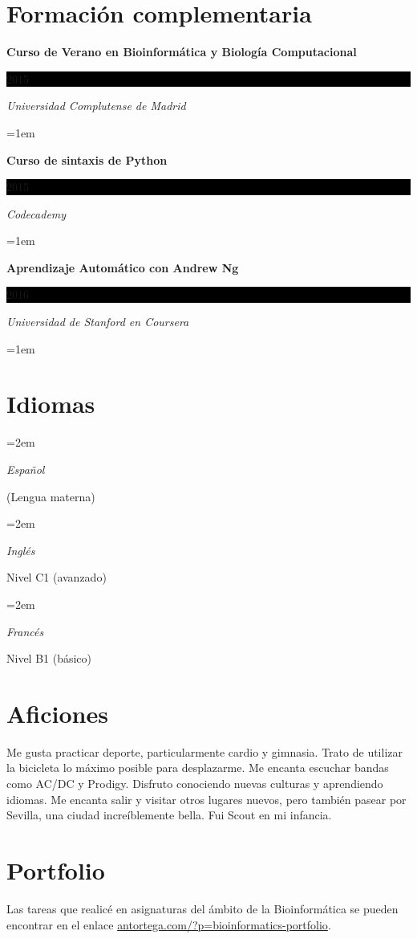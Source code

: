 \documentclass[paper=a4,fontsize=11pt]{article} %
\newlength{\spacebox}
\newcommand{\sepspace}{\vspace*{1em}}		%
\newcommand{\NewPart}[1]{\section*{
									{#1}}}
\newcommand{\PersonalEntry}[2]{
		\noindent\hangindent=2em\hangafter=0 %
		\parbox{\spacebox}{        %
		\textit{#1}}		       %
		\hspace{1.5em} #2 \par}    %
\newcommand{\SkillsEntry}[2]{      %
		\noindent\hangindent=2em\hangafter=0 %
		\parbox{\spacebox}{        %
		\textit{#1}}			   %
		\hspace{1.5em} #2 \par}    %
\newcommand{\EducationEntry}[4]{
		\noindent \textbf{#1} \hfill      %
		\colorbox{Black}{%
			\parbox{6em}{%
			\hfill\color{White}#2}} \par  %
		\noindent \textit{#3} \par        %
		\noindent\hangindent=1em\hangafter=0 \small #4 %
		\normalsize \par}
\newcommand{\AwardEntry}[4]{
		\noindent \textbf{#1} \hfill      %
		\colorbox{Black}{%
			\parbox{3em}{%
			\hfill\color{White}#2}} \par  %
		\noindent \textit{#3} \par        %
		\noindent\hangindent=1em\hangafter=0 \small #4 %
		\normalsize \par}
\begin{document}
  


  
  
\NewPart{Formación complementaria}{}


\AwardEntry{Curso de Verano en Bioinformática y Biología Computacional}{2015}{Universidad Complutense de Madrid}{}  
  
\AwardEntry{Curso de sintaxis de Python}{2015}{Codecademy}{}


\AwardEntry{Aprendizaje Automático con Andrew Ng}{2016}{Universidad de Stanford en Coursera}{}


\NewPart{Idiomas}

\SkillsEntry{Español}{(Lengua materna)}
\sepspace

\SkillsEntry{Inglés}{Nivel C1 (avanzado)}
\sepspace

\SkillsEntry{Francés}{Nivel B1 (básico)}
\sepspace




%
%


\NewPart{Aficiones}
Me gusta practicar deporte, particularmente cardio y gimnasia. Trato de utilizar la bicicleta lo máximo posible para desplazarme. Me encanta escuchar bandas como AC/DC y Prodigy. Disfruto conociendo nuevas culturas y aprendiendo idiomas. Me encanta salir y visitar otros lugares nuevos, pero también pasear por Sevilla, una ciudad increíblemente bella. Fui Scout en mi infancia.



\NewPart{Portfolio}

Las tareas que realicé en asignaturas del ámbito de la Bioinformática se pueden encontrar en el enlace \href{antortega.com/?p=bioinformatics-portfolio}{antortega.com/?p=bioinformatics-portfolio}.
\end{document}
